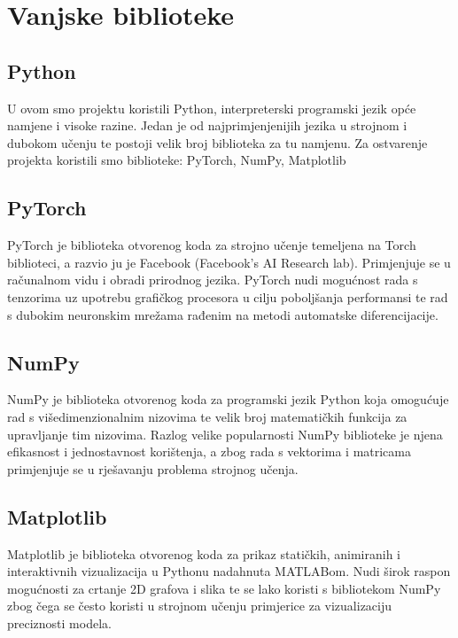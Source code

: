 \chapter{Vanjske biblioteke}

\section{Python}

U ovom smo projektu koristili Python, interpreterski programski jezik opće namjene i visoke razine. Jedan je od najprimjenjenijih jezika u strojnom i dubokom učenju te postoji velik broj biblioteka za tu namjenu. Za ostvarenje projekta koristili smo biblioteke: PyTorch, NumPy, Matplotlib 

\section{PyTorch}

PyTorch je biblioteka otvorenog koda za strojno učenje temeljena na Torch biblioteci, a razvio ju je Facebook (Facebook's AI Research lab). Primjenjuje se u računalnom vidu i obradi prirodnog jezika. PyTorch nudi mogućnost rada s tenzorima uz upotrebu grafičkog procesora u cilju poboljšanja performansi te rad s dubokim neuronskim mrežama rađenim na metodi automatske diferencijacije. 

\section{NumPy}

NumPy je biblioteka otvorenog koda za programski jezik Python koja omogućuje rad s višedimenzionalnim nizovima te velik broj matematičkih funkcija za upravljanje tim nizovima. Razlog velike popularnosti NumPy biblioteke je njena efikasnost i jednostavnost korištenja, a zbog rada s vektorima i matricama primjenjuje se u rješavanju problema strojnog učenja.

\section{Matplotlib}

Matplotlib je biblioteka otvorenog koda za prikaz statičkih, animiranih i interaktivnih vizualizacija u Pythonu nadahnuta MATLABom. Nudi širok raspon mogućnosti za crtanje 2D grafova i slika te se lako koristi s bibliotekom NumPy zbog čega se često koristi u strojnom učenju primjerice za vizualizaciju preciznosti modela.
